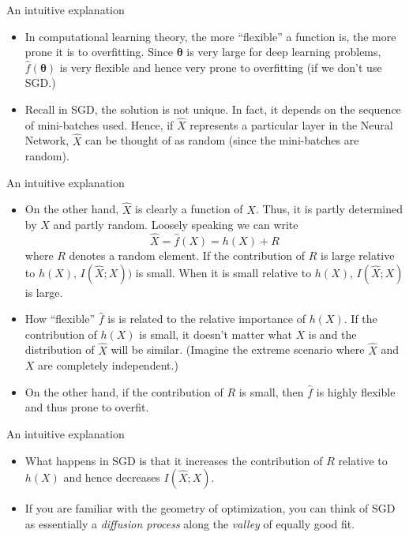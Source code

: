 \documentclass{beamer}
\begin{document}
\begin{frame}{An intuitive explanation}
\begin{itemize}
	\item In computational learning theory, the more ``flexible'' a function is, the more prone it is to overfitting. Since $\boldsymbol{\theta}$ is very large for deep learning problems, $\hat{f}(\boldsymbol{\theta})$ is very flexible and hence very prone to overfitting (if we don't use SGD.)
	\item Recall in SGD, the solution is not unique. In fact, it depends on the sequence of mini-batches used. Hence, if $\hat{X}$ represents a particular layer in the Neural Network, $\hat{X}$ can be thought of as random (since the mini-batches are random). 
\end{itemize}
\end{frame}

\begin{frame}{An intuitive explanation}
\begin{itemize}
	\item On the other hand, $\hat{X}$ is clearly a function of $X$. Thus, it is partly determined by $X$ and partly random. Loosely speaking we can write
	\[
	\hat{X} = \hat{f}(X) = h(X) + R
	\]
	where $R$ denotes a random element. If the contribution of $R$ is large relative to $h(X)$, $I(\hat{X};X))$ is small. When it is small relative to $h(X)$, $I(\hat{X};X)$ is large.
	\item How ``flexible'' $\hat{f}$ is is related to the relative importance of $h(X)$. If the contribution of $h(X)$ is small, it doesn't matter what $X$ is and the distribution of $\hat{X}$ will be similar. (Imagine the extreme scenario where $\hat{X}$ and $X$ are completely independent.)
	\item On the other hand, if the contribution of $R$ is small, then $\hat{f}$ is highly flexible and thus prone to overfit. 
\end{itemize}
\end{frame}

\begin{frame}{An intuitive explanation}
\begin{itemize}
	\item What happens in SGD is that it increases the contribution of $R$ relative to $h(X)$ and hence decreases $I(\hat{X};X)$. 
	\item If you are familiar with the geometry of optimization, you can think of SGD as essentially a \emph{diffusion process} along the \emph{valley} of equally good fit. 
\end{itemize}
\end{frame}
\end{document}

